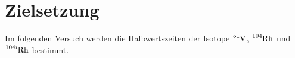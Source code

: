 \section{Zielsetzung}
\label{sec:Zielsetzung}
Im folgenden Versuch werden die Halbwertszeiten der Isotope $\ce{^{51}V}$, $\ce{^{104}Rh}$ und $\ce{^{104i}Rh}$ bestimmt. 
